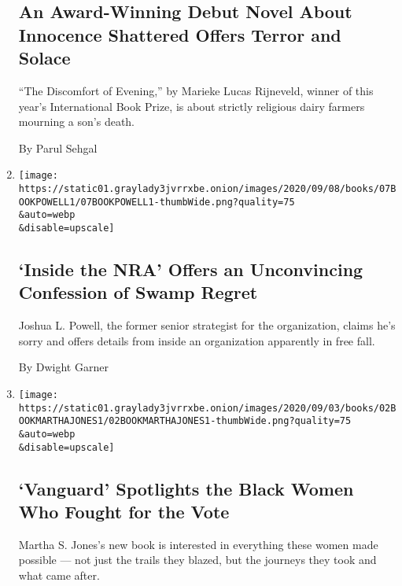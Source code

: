 \begin{enumerate}
{  \subsection{An Award-Winning Debut Novel About Innocence Shattered
  Offers Terror and
  Solace}\label{an-award-winning-debut-novel-about-innocence-shattered-offers-terror-and-solace}}

  ``The Discomfort of Evening,'' by Marieke Lucas Rijneveld, winner of
  this year's International Book Prize, is about strictly religious
  dairy farmers mourning a son's death.

  By Parul Sehgal
\item
  \href{/2020/09/07/books/review-inside-nra-joshua-powell.html}{}

  \texttt{[image: https://static01.graylady3jvrrxbe.onion/images/2020/09/08/books/07BOOKPOWELL1/07BOOKPOWELL1-thumbWide.png?quality=75\\\&auto=webp\\\&disable=upscale]}

  \hypertarget{inside-the-nra-offers-an-unconvincing-confession-of-swamp-regret}{%
  \subsection{`Inside the NRA' Offers an Unconvincing Confession of
  Swamp
  Regret}\label{inside-the-nra-offers-an-unconvincing-confession-of-swamp-regret}}

  Joshua L. Powell, the former senior strategist for the organization,
  claims he's sorry and offers details from inside an organization
  apparently in free fall.

  By Dwight Garner
\item
  \href{/2020/09/02/books/review-vanguard-black-women-broke-barriers-won-vote-martha-s-jones.html}{}

  \texttt{[image: https://static01.graylady3jvrrxbe.onion/images/2020/09/03/books/02BOOKMARTHAJONES1/02BOOKMARTHAJONES1-thumbWide.png?quality=75\\\&auto=webp\\\&disable=upscale]}

  \hypertarget{vanguard-spotlights-the-black-women-who-fought-for-the-vote}{%
  \subsection{`Vanguard' Spotlights the Black Women Who Fought for the
  Vote}\label{vanguard-spotlights-the-black-women-who-fought-for-the-vote}}

  Martha S. Jones's new book is interested in everything these women
  made possible --- not just the trails they blazed, but the journeys
  they took and what came after.


\end{enumerate}
